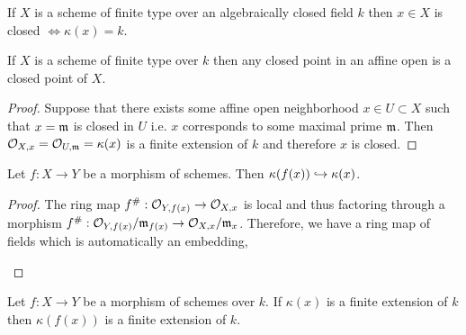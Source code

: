 \documentclass[12pt]{article}
\begin{document}
\begin{corollary}
If $X$ is a scheme of finite type over an algebraically closed field $k$ then $x \in X$ is closed $\iff \kappa(x) = k$. 
\end{corollary}

\begin{proposition}
If $X$ is a scheme of finite type over $k$ then any closed point in an affine open is a closed point of $X$. 
\end{proposition}

\begin{proof}
Suppose that there exists some affine open neighborhood $x \in U \subset X$ such that $x = \mathfrak{m}$ is closed in $U$ i.e. $x$ corresponds to some maximal prime $\mathfrak{m}$. Then $\mathcal{O}_{X, x} = \mathcal{O}_{U, \mathfrak{m}} = \kappa(x)$ is a finite extension of $k$ and therefore $x$ is closed.  
\end{proof}


\begin{proposition}
Let $f : X \to Y$ be a morphism of schemes. Then $\kappa(f(x)) \hookrightarrow \kappa(x)$.
\end{proposition}

\begin{proof}
The ring map $f^\# : \mathcal{O}_{Y, f(x)} \to \mathcal{O}_{X, x}$ is local and thus factoring through a morphism $f^\# : \mathcal{O}_{Y, f(x)} / \mathfrak{m}_{f(x)} \to \mathcal{O}_{X, x} / \mathfrak{m}_x$. Therefore, we have a ring map of fields which is automatically an embedding,
\begin{center}
\end{center}  
\end{proof}

\begin{proposition}
Let $f : X \to Y$ be a morphism of schemes over $k$. If $\kappa(x)$ is a finite extension of $k$ then $\kappa(f(x))$ is a finite extension of $k$. 
\end{proposition}
\end{document}
